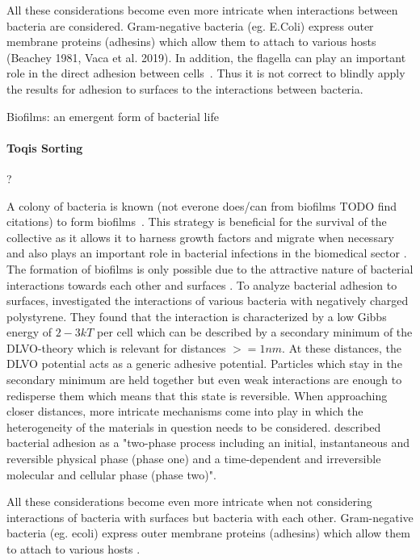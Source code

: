 \documentclass{article}
\begin{document}
All these considerations become even more intricate when interactions between bacteria are considered.
Gram-negative bacteria (eg. E.Coli) express outer membrane proteins (adhesins) which allow them to
attach to various hosts (Beachey 1981, Vaca et al. 2019).
In addition, the flagella can play an important role in the direct adhesion between
cells~\cite{Haiko2013}.
Thus it is not correct to blindly apply the results for adhesion to surfaces to the interactions
between bacteria.

Biofilms: an emergent form of bacterial life \cite{Flemming2016}

\paragraph{Toqis Sorting} ?

A colony of bacteria is known (not everone does/can from biofilms TODO find citations) to form biofilms~\cite{Dunne2002}.
This strategy is beneficial for the survival of the collective as it allows it to harness growth factors and migrate when necessary and also plays an important role in bacterial infections in the biomedical sector \cite{Ong1999}.
The formation of biofilms is only possible due to the attractive nature of bacterial interactions towards each other and surfaces \cite{Berne2018}.
To analyze bacterial adhesion to surfaces, \cite{vanLoosdrecht1989} investigated the interactions of various bacteria with negatively charged polystyrene.
They found that the interaction is characterized by a low Gibbs energy of $2-3kT$ per cell which can be described by a secondary minimum of the DLVO-theory \cite{Derjaguin1993,Verwey1947} which is relevant for distances $>=1nm$.
At these distances, the DLVO potential acts as a generic adhesive potential.
Particles which stay in the secondary minimum are held together but even weak interactions are enough to redisperse them which means that this state is reversible.
When approaching closer distances, more intricate mechanisms come into play in which the heterogeneity of the materials in question needs to be considered.
\cite{Hori2010} described bacterial adhesion as a "two-phase process including an initial, instantaneous and reversible physical phase (phase one) and a time-dependent and irreversible molecular and cellular phase (phase two)".

All these considerations become even more intricate when not considering interactions of bacteria with surfaces but bacteria with each other. Gram-negative bacteria (eg. \ac{ecoli}) express outer membrane proteins (adhesins) which allow them to attach to various hosts \cite{Vaca2019,Beachey1981}.
\end{document}
